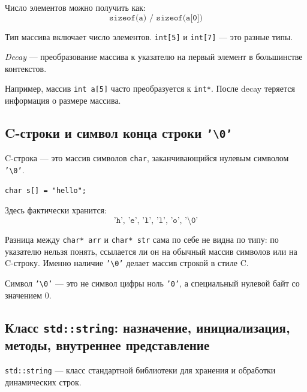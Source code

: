Число элементов можно получить как:
\[
\texttt{sizeof(a) / sizeof(a[0])}
\]

\begin{remark}
Тип массива включает число элементов. \texttt{int[5]} и \texttt{int[7]} — это разные типы.
\end{remark}

\begin{definition}[Decay]
\textit{Decay} — преобразование массива к указателю на первый элемент в большинстве контекстов.
\end{definition}

Например, массив \texttt{int a[5]} часто преобразуется к \texttt{int*}. После decay теряется информация о размере массива.

\subsection{C-строки и символ конца строки \texttt{'\textbackslash 0'}} 
\begin{definition}[C-string]
C-строка — это массив символов \texttt{char}, заканчивающийся нулевым символом \texttt{'\textbackslash 0'}.
\end{definition}

\begin{example}
\begin{verbatim}
char s[] = "hello";
\end{verbatim}
\end{example}

Здесь фактически хранится:
\[
\texttt{'h', 'e', 'l', 'l', 'o', '\textbackslash 0'}
\]

Разница между \texttt{char* arr} и \texttt{char* str} сама по себе не видна по типу: по указателю нельзя понять, ссылается ли он на обычный массив символов или на C-строку. Именно наличие \texttt{'\textbackslash 0'} делает массив строкой в стиле C.

\begin{remark}
Символ \texttt{'\textbackslash 0'} — это не символ цифры ноль \texttt{'0'}, а специальный нулевой байт со значением 0.
\end{remark}

\subsection{Класс \texttt{std::string}: назначение, инициализация, методы, внутреннее представление}
\begin{definition}
\texttt{std::string} — класс стандартной библиотеки для хранения и обработки динамических строк.
\end{definition}


